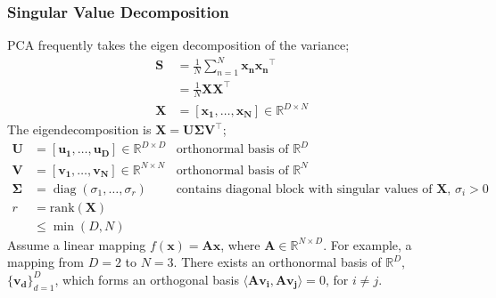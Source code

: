 \documentclass[a4paper, 12pt]{article}
\newcommand{\summation}[2]{\sum\limits_{#1}^{#2}}
\newcommand{\mat}[1]{\boldsymbol{#1}}
\renewcommand{\vec}[1]{\boldsymbol{#1}}
\newcommand{\la}{\langle}
\newcommand{\ra}{\rangle}
\newcommand{\mbbr}[0]{\mathbb{R}}
\DeclareMathOperator*{\diag}{diag}
\begin{document}
            \subsubsection*{Singular Value Decomposition}
                PCA frequently takes the eigen decomposition of the variance;
                \begin{align*}
                    \mat{S} & = \frac{1}{N} \summation{n = 1}{N} \mat{x_n}\mat{x_n}^\top \\
                    & = \frac{1}{N} \mat{X}\mat{X}^\top \\
                    \mat{X} & = [\mat{x_1}, \dots, \mat{x_N}] \in \mbbr^{D \times N}
                \end{align*}
                The eigendecomposition is $\mat{X} = \mat{U} \mat{\Sigma} \mat{V}^\top$;
                \begin{align*}
                    \mat{U} & = [\mat{u_1}, \dots, \mat{u_D}] \in \mbbr^{D \times D} & \text{orthonormal basis of $\mbbr^D$} \\
                    \mat{V} & = [\mat{v_1}, \dots, \mat{v_N}] \in \mbbr^{N \times N} & \text{orthonormal basis of $\mbbr^N$} \\
                    \mat{\Sigma} & = \diag(\sigma_1, \dots, \sigma_r) & \text{contains diagonal block with singular values of $\mat{X}$, $\sigma_i > 0$} \\
                    r & = \mathrm{rank}(\mat{X}) \\
                    & \leq \min(D, N)
                \end{align*}
                Assume a linear mapping $f(\vec{x}) = \mat{A}\vec{x}$, where $\mat{A} \in \mbbr^{N \times D}$.
                For example, a mapping from $D = 2$ to $N = 3$.
                There exists an orthonormal basis of $\mbbr^D$, $\{ \mat{v_d} \}_{d = 1}^D$, which forms an orthogonal basis $\la \mat{A}\mat{v_i}, \mat{A}\vec{v_j} \ra = 0$, for $i \neq j$.
                \medskip
\end{document}
